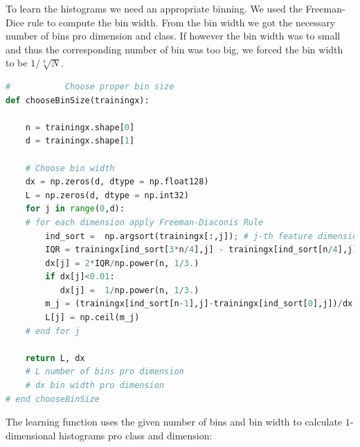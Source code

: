 \documentclass{article}
\begin{document}
To learn the histograms we need an appropriate binning. We used the Freeman-Dice rule to compute the bin width. From the bin width we got the necessary number of bins pro dimension and class. If however the bin width was to small and thus the corresponding number of bin was too big, we forced the bin width to be $1/\sqrt[3]{N}$.

\begin{lstlisting}[language=Python]
# 			Choose proper bin size
def chooseBinSize(trainingx):
  
    n = trainingx.shape[0]
    d = trainingx.shape[1]
    
    # Choose bin width 
    dx = np.zeros(d, dtype = np.float128)
    L = np.zeros(d, dtype = np.int32)
    for j in range(0,d):
	# for each dimension apply Freeman-Diaconis Rule
        ind_sort =  np.argsort(trainingx[:,j]); # j-th feature dimension
        IQR = trainingx[ind_sort[3*n/4],j] - trainingx[ind_sort[n/4],j]        
        dx[j] = 2*IQR/np.power(n, 1/3.)        
        if dx[j]<0.01:
           dx[j] =  1/np.power(n, 1/3.)  
        m_j = (trainingx[ind_sort[n-1],j]-trainingx[ind_sort[0],j])/dx[j]   
        L[j] = np.ceil(m_j)
    # end for j
        
    return L, dx 
    # L number of bins pro dimension
    # dx bin width pro dimension
# end chooseBinSize
\end{lstlisting}

The learning function uses the given number of bins and bin width to calculate $1$-dimensional histograms pro class and dimension:
\end{document}

